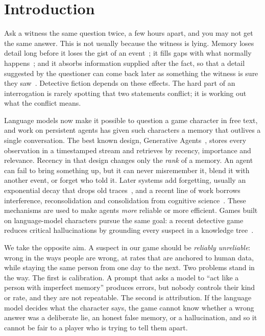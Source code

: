 \documentclass[conference]{IEEEtran}
\begin{document}
\section{Introduction}

Ask a witness the same question twice, a few hours apart, and you may not get the same answer.
This is not usually because the witness is lying. Memory loses detail long before it loses the gist
of an event~\cite{brainerd2002fuzzy}; it fills gaps with what normally happens~\cite{bartlett1932};
and it absorbs information supplied after the fact, so that a detail suggested by the questioner can
come back later as something the witness is sure they saw~\cite{loftus1974,loftus1978,johnson1993}.
Detective fiction depends on these effects. The hard part of an interrogation is rarely spotting
that two statements conflict; it is working out what the conflict means.

Language models now make it possible to question a game character in free text, and work on
persistent agents has given such characters a memory that outlives a single conversation. The best
known design, Generative Agents~\cite{park2023generative}, stores every observation in a timestamped
stream and retrieves by recency, importance and relevance. Recency in that design changes only the
\emph{rank} of a memory. An agent can fail to bring something up, but it can never misremember it,
blend it with another event, or forget who told it. Later systems add forgetting, usually an
exponential decay that drops old traces~\cite{zhong2024memorybank}, and a recent line of work borrows
interference, reconsolidation and consolidation from cognitive science~\cite{humaninspired2026,
reconsolidation2026}. These mechanisms are used to make agents \emph{more} reliable or more efficient.
Games built on language-model characters pursue the same goal: a recent detective game reduces
critical hallucinations by grounding every suspect in a knowledge tree~\cite{detective2026}.

We take the opposite aim. A suspect in our game should be \emph{reliably unreliable}: wrong in the
ways people are wrong, at rates that are anchored to human data, while staying the same person from
one day to the next. Two problems stand in the way. The first is calibration. A prompt that asks a
model to ``act like a person with imperfect memory'' produces errors, but nobody controls their kind
or rate, and they are not repeatable. The second is attribution. If the language model decides what
the character says, the game cannot know whether a wrong answer was a deliberate lie, an honest false
memory, or a hallucination, and so it cannot be fair to a player who is trying to tell them apart.
\end{document}
